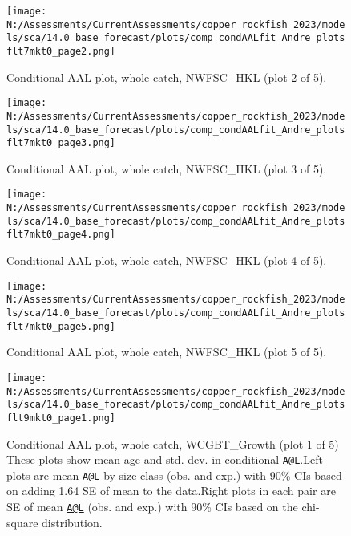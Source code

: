 \documentclass[11pt,
  english,
  letterpaper,
]{article}
\begin{document}
\begin{figure}
\centering
\texttt{[image: N:/Assessments/CurrentAssessments/copper\_rockfish\_2023/models/sca/14.0\_base\_forecast/plots/comp\_condAALfit\_Andre\_plotsflt7mkt0\_page2.png]}
\caption{Conditional AAL plot, whole catch, NWFSC\_HKL (plot 2 of 5).\label{fig:comp_condAALfit_Andre_plotsflt7mkt0_page2}}
\end{figure}

\begin{figure}
\centering
\texttt{[image: N:/Assessments/CurrentAssessments/copper\_rockfish\_2023/models/sca/14.0\_base\_forecast/plots/comp\_condAALfit\_Andre\_plotsflt7mkt0\_page3.png]}
\caption{Conditional AAL plot, whole catch, NWFSC\_HKL (plot 3 of 5).\label{fig:comp_condAALfit_Andre_plotsflt7mkt0_page3}}
\end{figure}

\begin{figure}
\centering
\texttt{[image: N:/Assessments/CurrentAssessments/copper\_rockfish\_2023/models/sca/14.0\_base\_forecast/plots/comp\_condAALfit\_Andre\_plotsflt7mkt0\_page4.png]}
\caption{Conditional AAL plot, whole catch, NWFSC\_HKL (plot 4 of 5).\label{fig:comp_condAALfit_Andre_plotsflt7mkt0_page4}}
\end{figure}

\begin{figure}
\centering
\texttt{[image: N:/Assessments/CurrentAssessments/copper\_rockfish\_2023/models/sca/14.0\_base\_forecast/plots/comp\_condAALfit\_Andre\_plotsflt7mkt0\_page5.png]}
\caption{Conditional AAL plot, whole catch, NWFSC\_HKL (plot 5 of 5).\label{fig:comp_condAALfit_Andre_plotsflt7mkt0_page5}}
\end{figure}

\begin{figure}
\centering
\texttt{[image: N:/Assessments/CurrentAssessments/copper\_rockfish\_2023/models/sca/14.0\_base\_forecast/plots/comp\_condAALfit\_Andre\_plotsflt9mkt0\_page1.png]}
\caption{Conditional AAL plot, whole catch, WCGBT\_Growth (plot 1 of 5) These plots show mean age and std. dev. in conditional \href{mailto:A@L}{\nolinkurl{A@L}}.Left plots are mean \href{mailto:A@L}{\nolinkurl{A@L}} by size-class (obs. and exp.) with 90\% CIs based on adding 1.64 SE of mean to the data.Right plots in each pair are SE of mean \href{mailto:A@L}{\nolinkurl{A@L}} (obs. and exp.) with 90\% CIs based on the chi-square distribution.\label{fig:comp_condAALfit_Andre_plotsflt9mkt0_page1}}
\end{figure}
\end{document}
